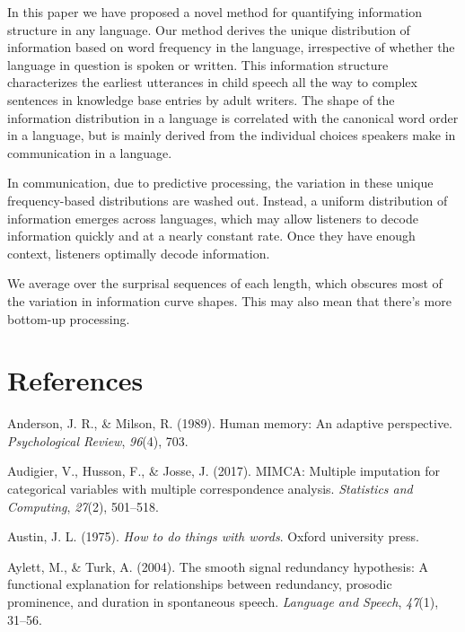 \documentclass[10pt, letterpaper]{article}
\begin{document}
In this paper we have proposed a novel method for quantifying
information structure in any language. Our method derives the unique
distribution of information based on word frequency in the language,
irrespective of whether the language in question is spoken or written.
This information structure characterizes the earliest utterances in
child speech all the way to complex sentences in knowledge base entries
by adult writers. The shape of the information distribution in a
language is correlated with the canonical word order in a language, but
is mainly derived from the individual choices speakers make in
communication in a language.

In communication, due to predictive processing, the variation in these
unique frequency-based distributions are washed out. Instead, a uniform
distribution of information emerges across languages, which may allow
listeners to decode information quickly and at a nearly constant rate.
Once they have enough context, listeners optimally decode information.

We average over the surprisal sequences of each length, which obscures
most of the variation in information curve shapes. This may also mean
that there's more bottom-up processing.

\hypertarget{references}{%
\section{References}\label{references}}

\setlength{\parindent}{-0.1in} 
\setlength{\leftskip}{0.125in}

\noindent

\hypertarget{refs}{}
\leavevmode\hypertarget{ref-anderson1989}{}%
Anderson, J. R., \& Milson, R. (1989). Human memory: An adaptive
perspective. \emph{Psychological Review}, \emph{96}(4), 703.

\leavevmode\hypertarget{ref-audigier2017}{}%
Audigier, V., Husson, F., \& Josse, J. (2017). MIMCA: Multiple
imputation for categorical variables with multiple correspondence
analysis. \emph{Statistics and Computing}, \emph{27}(2), 501--518.

\leavevmode\hypertarget{ref-austin1975}{}%
Austin, J. L. (1975). \emph{How to do things with words}. Oxford
university press.

\leavevmode\hypertarget{ref-aylett2004}{}%
Aylett, M., \& Turk, A. (2004). The smooth signal redundancy hypothesis:
A functional explanation for relationships between redundancy, prosodic
prominence, and duration in spontaneous speech. \emph{Language and
Speech}, \emph{47}(1), 31--56.
\end{document}
